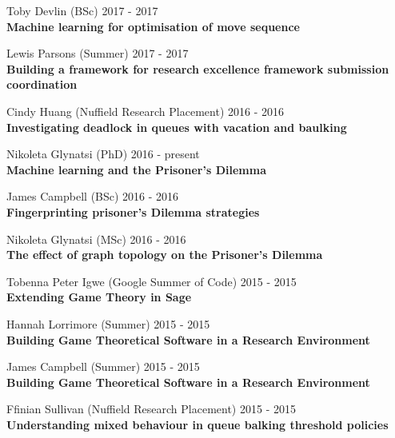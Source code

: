 \documentclass[10pt]{res} %
\begin{document}
\begin{resume}
\begin{etaremune}
\item
    Toby Devlin (BSc) \hfill 2017 -
    2017\\
\textbf{Machine learning for optimisation of move sequence}\\

\item
    Lewis Parsons (Summer) \hfill 2017 -
    2017\\
\textbf{Building a framework for research excellence framework submission coordination}\\

\item
    Cindy Huang (Nuffield Research Placement) \hfill 2016 -
    2016\\
\textbf{Investigating deadlock in queues with vacation and baulking}\\

\item
    Nikoleta Glynatsi (PhD) \hfill 2016 -
    present\\
\textbf{Machine learning and the Prisoner's Dilemma}\\

\item
    James Campbell (BSc) \hfill 2016 -
    2016\\
\textbf{Fingerprinting prisoner's Dilemma strategies}\\

\item
    Nikoleta Glynatsi (MSc) \hfill 2016 -
    2016\\
\textbf{The effect of graph topology on the Prisoner's Dilemma}\\

\item
    Tobenna Peter Igwe (Google Summer of Code) \hfill 2015 -
    2015\\
\textbf{Extending Game Theory in Sage}\\

\item
    Hannah Lorrimore (Summer) \hfill 2015 -
    2015\\
\textbf{Building Game Theoretical Software in a Research Environment}\\

\item
    James Campbell (Summer) \hfill 2015 -
    2015\\
\textbf{Building Game Theoretical Software in a Research Environment}\\

\item
    Ffinian Sullivan (Nuffield Research Placement) \hfill 2015 -
    2015\\
\textbf{Understanding mixed behaviour in queue balking threshold policies}\\


\end{etaremune}
\end{resume}
\end{document}
